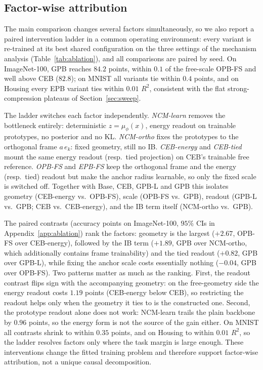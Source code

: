 \subsection{Factor-wise attribution}
\label{sec:ablation}
The main comparison changes several factors simultaneously, so we also report a
paired intervention ladder in a common operating environment: every variant is
re-trained at its best shared configuration on the three settings of the mechanism
analysis (Table~\ref{tab:ablation}), and all comparisons are paired by seed. On
ImageNet-100, GPB reaches $84.2$ points, within $0.1$ of the free-scale OPB-FS and
well above CEB ($82.8$); on MNIST all variants tie within $0.4$ points, and on
Housing every EPB variant ties within $0.01$ $R^2$, consistent with the flat
strong-compression plateaus of Section~\ref{sec:sweep}.

The ladder switches each factor independently. \emph{NCM-learn} removes the
bottleneck entirely: deterministic $z=\mu_\phi(x)$, energy readout on trainable
prototypes, no posterior and no KL. \emph{NCM-ortho} fixes the prototypes to the
orthogonal frame $a\,e_k$: fixed geometry, still no IB. \emph{CEB-energy} and
\emph{CEB-tied} mount the same energy readout (resp.\ tied projection) on CEB's
trainable free reference. \emph{OPB-FS} and \emph{EPB-FS} keep the orthogonal frame
and the energy (resp.\ tied) readout but make the anchor radius learnable, so only
the fixed scale is switched off. Together with Base, CEB, GPB-L and GPB this
isolates geometry (CEB-energy vs.\ OPB-FS), scale (OPB-FS vs.\ GPB), readout
(GPB-L vs.\ GPB; CEB vs.\ CEB-energy), and the IB term itself (NCM-ortho vs.\ GPB).



The paired contrasts (accuracy points on ImageNet-100, $95\%$ CIs in
Appendix~\ref{app:ablation}) rank the factors: geometry is the largest ($+2.67$,
OPB-FS over CEB-energy), followed by the IB term ($+1.89$, GPB over NCM-ortho, which
additionally contains frame trainability) and the tied readout ($+0.82$, GPB over
GPB-L), while fixing the anchor scale costs essentially nothing ($-0.04$, GPB over
OPB-FS). Two patterns matter as much as the ranking. First, the readout contrast
flips sign with the accompanying geometry: on the free-geometry side the energy
readout costs $1.19$ points (CEB-energy below CEB), so restricting the readout helps
only when the geometry it ties to is the constructed one. Second, the prototype
readout alone does not work: NCM-learn trails the plain backbone by $0.96$ points,
so the energy form is not the source of the gain either. On MNIST all contrasts
shrink to within $0.35$ points, and on Housing to within $0.01$ $R^2$, so the ladder
resolves factors only where the task margin is large enough. These interventions
change the fitted training problem and therefore support factor-wise attribution,
not a unique causal decomposition.


